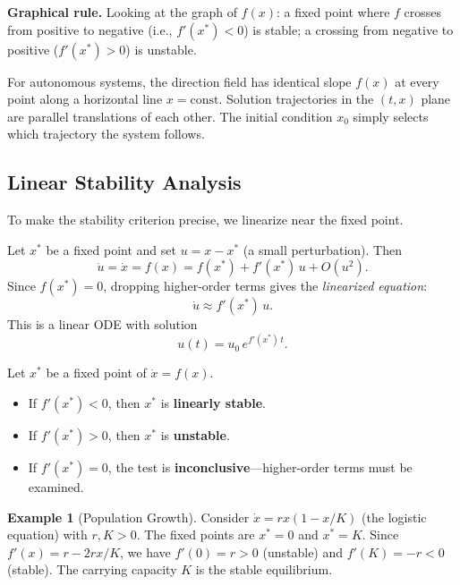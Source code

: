 \documentclass[11pt,letterpaper]{article}
\theoremstyle{definition}
\newtheorem{example}{Example}[section]
\theoremstyle{plain}
\theoremstyle{remark}
\newcommand{\xdot}{\dot{x}}
\newcommand{\xstar}{x^*}
\newcommand{\fp}[1]{f'(#1)}
\begin{document}
\noindent\textbf{Graphical rule.}
Looking at the graph of $f(x)$: a fixed point where $f$ crosses from
positive to negative (i.e., $\fp{\xstar}<0$) is stable; a crossing from
negative to positive ($\fp{\xstar}>0$) is unstable.

\begin{physicalnote}
For autonomous systems, the direction field has identical slope $f(x)$ at
every point along a horizontal line $x = \text{const}$.  Solution
trajectories in the $(t,x)$ plane are parallel translations of each other.
The initial condition $x_0$ simply selects which trajectory the system
follows.
\end{physicalnote}

\subsection{Linear Stability Analysis}\label{sec:lin-stab-1d}

To make the stability criterion precise, we linearize near the fixed point.

Let $\xstar$ be a fixed point and set $u = x - \xstar$ (a small
perturbation).  Then
\[
  \dot{u} = \xdot = f(x) = f(\xstar) + \fp{\xstar}\,u + O(u^2).
\]
Since $f(\xstar)=0$, dropping higher-order terms gives the \emph{linearized
equation}:
\begin{equation}\label{eq:lin-1d}
  \dot{u} \approx \fp{\xstar}\, u.
\end{equation}
This is a linear ODE with solution
\begin{equation}\label{eq:lin-1d-soln}
  u(t) = u_0 \, e^{\fp{\xstar}\, t}.
\end{equation}

\begin{keyresult}
Let $\xstar$ be a fixed point of $\xdot = f(x)$.
\begin{itemize}[leftmargin=2em]
\item If $\fp{\xstar} < 0$, then $\xstar$ is \textbf{linearly stable}.
\item If $\fp{\xstar} > 0$, then $\xstar$ is \textbf{unstable}.
\item If $\fp{\xstar} = 0$, the test is \textbf{inconclusive}---higher-order
      terms must be examined.
\end{itemize}
\end{keyresult}

\begin{example}[Population Growth]
Consider $\xdot = rx(1-x/K)$ (the logistic equation) with $r,K>0$.
The fixed points are $\xstar=0$ and $\xstar=K$.
Since $f'(x) = r - 2rx/K$, we have $f'(0)=r>0$ (unstable) and
$f'(K)=-r<0$ (stable).  The carrying capacity $K$ is the stable
equilibrium.
\end{example}
\end{document}
